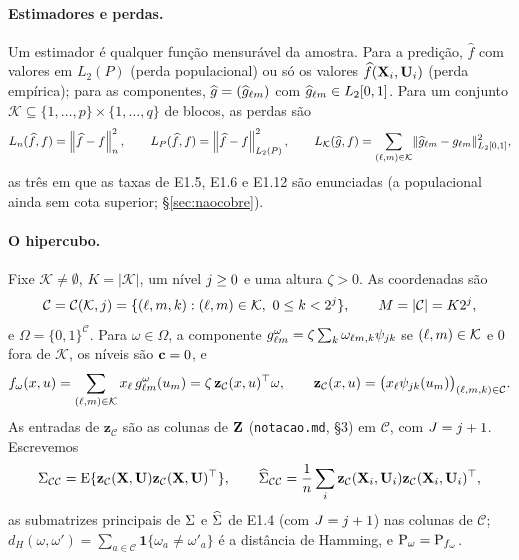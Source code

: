 \documentclass[11pt,a4paper]{article}
\newcommand{\Kcal}{\mathcal{K}}
\newcommand{\Ccal}{\mathcal{C}}
\newcommand{\dH}{d_{H}}
\newcommand{\bz}{\mathbf{z}}
\newcommand{\Lk}{L_{\mathcal{K}}}
\begin{document}
\paragraph{Estimadores e perdas.} Um estimador é qualquer função mensurável
da amostra. Para a predição, $\widehat f$ com valores em $L_{2}(P)$ (perda
populacional) ou só os valores $\widehat f(\mathbf{X}_{i},\mathbf{U}_{i})$ (perda empírica);
para as componentes, $\widehat g = (\widehat g_{\ell m})$ com
$\widehat g_{\ell m} \in L_{2}[0,1]$. Para um conjunto $\Kcal \subseteq
\{1,\dots,p\}\times\{1,\dots,q\}$ de blocos, as perdas são
\[
  L_{n}(\widehat f,f) = \normn{\widehat f - f}^{2},
  \qquad
  L_{P}(\widehat f,f) = \normL{\widehat f - f}^{2},
  \qquad
  \Lk(\widehat g,f) = \sum_{(\cv,\md)\in\Kcal}
  \lVert\widehat g_{\cv\md} - \gcomp{\cv}{\md}\rVert_{L_{2}[0,1]}^{2},
\]
as três em que as taxas de E1.5, E1.6 e E1.12 são enunciadas (a
populacional ainda sem cota superior; §\ref{sec:naocobre}).

\paragraph{O hipercubo.} Fixe $\Kcal \ne \emptyset$, $K = |\Kcal|$, um nível
$j \ge 0$ e uma altura $\zeta > 0$. As coordenadas são
\[
  \Ccal = \Ccal(\Kcal,\lev) = \{(\cv,\md,\tsl) : (\cv,\md) \in \Kcal,\
  0 \le \tsl < 2^{\lev}\},
  \qquad M = |\Ccal| = K2^{\lev},
\]
e $\Omega = \{0,1\}^{\Ccal}$. Para $\omega \in \Omega$, a componente
$g_{\ell m}^{\omega} = \zeta\sum_{k}\omega_{\ell m,k}
\psi_{jk}$ se $(\cv,\md) \in \Kcal$ e $0$ fora de $\Kcal$, os níveis
são $\mathbf{c} = 0$, e
\[
  f_{\omega}(x,u) = \sum_{(\cv,\md)\in\Kcal}x_{\cv}\,\gcomp{\cv}{\md}^{\omega}(u_{\md})
  = \zeta\,\bz_{\Ccal}(x,u)\T\omega,
  \qquad
  \bz_{\Ccal}(x,u) = \bigl(x_{\cv}\wav{\lev}{\tsl}(u_{\md})\bigr)_{(\cv,\md,\tsl)\in\Ccal}.
\]
As entradas de $\bz_{\Ccal}$ são as colunas de $\mathbf{Z}$ (\texttt{notacao.md},
§3) em $\Ccal$, com $J = j + 1$. Escrevemos
\[
  \Gram_{\Ccal\Ccal} = \E\{\bz_{\Ccal}(\bX,\bU)\bz_{\Ccal}(\bX,\bU)\T\},
  \qquad
  \Gramhat_{\Ccal\Ccal} = \frac1n\sum_{i}\bz_{\Ccal}(\bX_{i},\bU_{i})
  \bz_{\Ccal}(\bX_{i},\bU_{i})\T,
\]
as submatrizes principais de $\Sigma$ e $\widehat{\Sigma}$ de E1.4 (com $J = j+1$)
nas colunas de $\Ccal$; $\dH(\omega,\omega') = \sum_{a\in\Ccal}
\mathbf{1}\{\omega_{a} \ne \omega'_{a}\}$ é a distância de Hamming, e
$\mathrm{P}_{\omega} = \mathrm{P}_{f_{\omega}}$.
\end{document}
